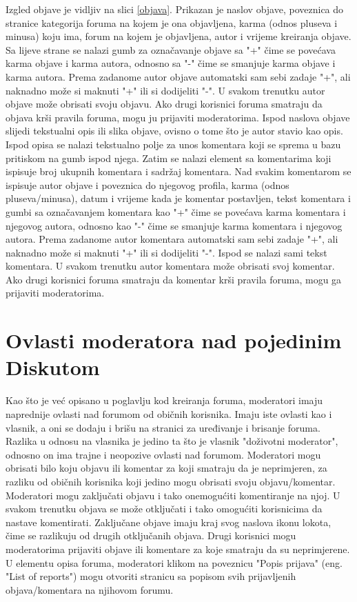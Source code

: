 \documentclass{foi}
\begin{document}
Izgled objave je vidljiv na slici \ref{objava}. Prikazan je naslov objave, poveznica do stranice kategorija foruma na kojem je ona objavljena, karma (odnos pluseva i minusa) koju ima, forum na kojem je objavljena, autor i vrijeme kreiranja objave. Sa lijeve strane se nalazi gumb za označavanje objave sa "+" čime se povećava karma objave i karma autora, odnosno sa "-" čime se smanjuje karma objave i karma autora. Prema zadanome autor objave automatski sam sebi zadaje "+", ali naknadno može si maknuti "+" ili si dodijeliti "-". U svakom trenutku autor objave može obrisati svoju objavu. Ako drugi korisnici foruma smatraju da objava krši pravila foruma, mogu ju prijaviti moderatorima. Ispod naslova objave slijedi tekstualni opis ili slika objave, ovisno o tome što je autor stavio kao opis. Ispod opisa se nalazi tekstualno polje za unos komentara koji se sprema u bazu pritiskom na gumb ispod njega. Zatim se nalazi element sa komentarima koji ispisuje broj ukupnih komentara i sadržaj komentara. Nad svakim komentarom se ispisuje autor objave i poveznica do njegovog profila, karma (odnos pluseva/minusa), datum i vrijeme kada je komentar postavljen, tekst komentara i gumbi sa označavanjem komentara kao "+" čime se povećava karma komentara i njegovog autora, odnosno kao "-" čime se smanjuje karma komentara i njegovog autora. Prema zadanome autor komentara automatski sam sebi zadaje "+", ali naknadno može si maknuti "+" ili si dodijeliti "-". Ispod se nalazi sami tekst komentara. U svakom trenutku autor komentara može obrisati svoj komentar. Ako drugi korisnici foruma smatraju da komentar krši pravila foruma, mogu ga prijaviti moderatorima.

\section{Ovlasti moderatora nad pojedinim Diskutom}

Kao što je već opisano u poglavlju kod kreiranja foruma, moderatori imaju naprednije ovlasti nad forumom od običnih korisnika. Imaju iste ovlasti kao i vlasnik, a oni se dodaju i brišu na stranici za uređivanje i brisanje foruma. Razlika u odnosu na vlasnika je jedino ta što je vlasnik "doživotni moderator", odnosno on ima trajne i neopozive ovlasti nad forumom. Moderatori mogu obrisati bilo koju objavu ili komentar za koji smatraju da je neprimjeren, za razliku od običnih korisnika koji jedino mogu obrisati svoju objavu/komentar. Moderatori mogu zaključati objavu i tako onemogućiti komentiranje na njoj. U svakom trenutku objava se može otključati i tako omogućiti korisnicima da nastave komentirati. Zaključane objave imaju kraj svog naslova ikonu lokota, čime se razlikuju od drugih otključanih objava. Drugi korisnici mogu moderatorima prijaviti objave ili komentare za koje smatraju da su neprimjerene. U elementu opisa foruma, moderatori klikom na poveznicu "Popis prijava" (eng. "List of reports") mogu otvoriti stranicu sa popisom svih prijavljenih objava/komentara na njihovom forumu.
\end{document}
